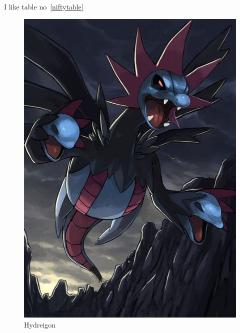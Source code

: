 \documentclass{article}
\begin{document}
I like table no~\ref{niftytable}

\begin{figure}
    \centering
    \includegraphics[width=\textwidth]{img1}
    \caption{Hydreigon}\label{hydreigon}



\end{figure}
\end{document}
